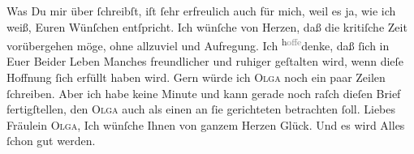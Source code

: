 \pstart
           Was Du mir über \label{K_L03097-2v}\label{K_L03097-2h} ſchreibſt,
               iſt ſehr erfreulich auch für mich, weil es ja, wie ich weiß, Euren Wünſchen
               entſpricht. Ich wünſche von Herzen, daß die kritiſche Zeit vorübergehen möge, ohne
                   allzuviel \label{K_L03097-3v}\label{K_L03097-3h} und Aufregung. Ich \substVorne{}\textsuperscript{h\textcolor{gray}{offe}}\substDazwischen{}denke\substHinten{}, daß ſich in Euer Beider Leben Manches freundlicher {\pb}und ruhiger geſtalten wird, wenn
               dieſe Hoffnung ſich erfüllt haben wird. Gern würde ich \textsc{Olga} noch ein paar Zeilen ſchreiben. Aber ich habe keine Minute und kann gerade noch
               raſch dieſen Brief fertigſtellen, den \textsc{Olga} auch als einen an ſie gerichteten betrachten ſoll. Liebes Fräulein \textsc{Olga}, Ich wünſche Ihnen von ganzem Herzen Glück. Und es wird Alles ſchon gut
               werden.\pend
           
